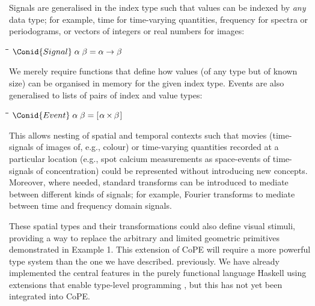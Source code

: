 Signals are generalised in the index type such that values can
be indexed by \emph{any} data type; for example, time for time-varying
quantities, frequency for spectra or periodograms, or vectors of
integers or real numbers for images:
\begin{tabbing}
\qquad\=\hspace{\lwidth}\=\hspace{\cwidth}\=\+\kill
$\Conid{Signal}\;\alpha\;\beta\mathrel{=}\alpha \to \beta$
\end{tabbing}
We merely require functions that define how values (of any type but of
known size) can be organised in memory for the given index type.
%
Events are also generalised to lists of pairs of index and value types: 
\begin{tabbing}
\qquad\=\hspace{\lwidth}\=\hspace{\cwidth}\=\+\kill
${\Conid{Event}\;\alpha\;\beta\mathrel{=}[\mskip1.5mu \alpha\;\!\!\times\!\!\;\beta\mskip1.5mu]}$
\end{tabbing}
This allows nesting of spatial and temporal contexts such that movies
(time-signals of images of, e.g., colour) or time-varying quantities
recorded at a particular location (e.g., spot calcium
measurements as space-events of time-signals of
concentration\cite{DiGregorio1999}) could be represented without
introducing new concepts. Moreover, where needed, standard transforms
can be introduced to mediate between different kinds of signals; for example,
Fourier transforms to mediate between time and frequency domain signals.

These spatial types and their transformations could also define visual
stimuli, providing a way to replace the arbitrary and limited
geometric primitives demonstrated in Example 1. This extension of CoPE
will require a more powerful type system than the one we have described.
previously. We have already implemented the central features in the purely
functional language Haskell using extensions that enable type-level
programming \cite{Kiselyov2010}, but this has not yet been integrated
into CoPE.
